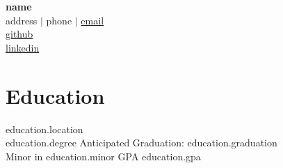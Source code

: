 \documentclass[11pt]{article}
\begin{document}
\begin{center}
    {\LARGE \textbf{ {{ name }} }} \\
    {{ address }} $|$ {{ phone }} $|$ \href{mailto:{{ email }}}{{ email }} \\
    \href{ {{ github }} }{ {{ github }} } \\
    \href{ {{ linkedin }} }{ {{ linkedin }} }
\end{center}

\section*{Education}
\textbf{} \hfill {{ education.location }} \\
{{ education.degree }} \hfill Anticipated Graduation: {{ education.graduation }} \\
Minor in {{ education.minor }} \hfill GPA {{ education.gpa }}

\end{document}
